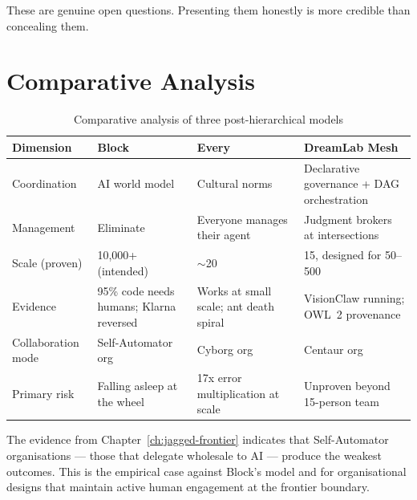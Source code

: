 These are genuine open questions. Presenting them honestly is more credible than concealing them.

\section{Comparative Analysis}

\begin{table}[h]
\centering
\caption{Comparative analysis of three post-hierarchical models}
\label{tab:three-models}
\begin{tabularx}{\textwidth}{l L{3cm} L{3cm} X}
\toprule
\textbf{Dimension} & \textbf{Block} & \textbf{Every} & \textbf{DreamLab Mesh} \\
\midrule
Coordination & AI world model & Cultural norms & Declarative governance + DAG orchestration \\
\addlinespace
Management & Eliminate & Everyone manages their agent & Judgment brokers at intersections \\
\addlinespace
Scale (proven) & 10,000+ (intended) & $\sim$20 & 15, designed for 50--500 \\
\addlinespace
Evidence & 95\% code needs humans; Klarna reversed & Works at small scale; ant death spiral & VisionClaw running; OWL~2 provenance \\
\addlinespace
Collaboration mode & Self-Automator org & Cyborg org & Centaur org \\
\addlinespace
Primary risk & Falling asleep at the wheel & 17x error multiplication at scale & Unproven beyond 15-person team \\
\bottomrule
\end{tabularx}
\end{table}

The evidence from Chapter~\ref{ch:jagged-frontier} indicates that Self-Automator organisations --- those that delegate wholesale to AI --- produce the weakest outcomes. This is the empirical case against Block's model and for organisational designs that maintain active human engagement at the frontier boundary.
